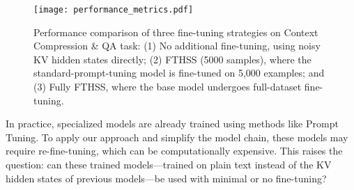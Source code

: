 \begin{figure}[t]
\centering
\texttt{[image: performance\_metrics.pdf]}
\caption{Performance comparison of three fine-tuning strategies on Context Compression \& QA task: (1) No additional fine-tuning, using noisy KV hidden states directly; (2) FTHSS (5000 samples), where the standard-prompt-tuning model is fine-tuned on 5,000 examples; and (3) Fully FTHSS, where the base model undergoes full-dataset fine-tuning.}
\label{fig:training_scale}
\end{figure}
In practice, specialized models are already trained using methods like Prompt Tuning. To apply our approach and simplify the model chain, these models may require re-fine-tuning, which can be computationally expensive. This raises the question: can these trained models—trained on plain text instead of the KV hidden states of previous models—be used with minimal or no fine-tuning?





